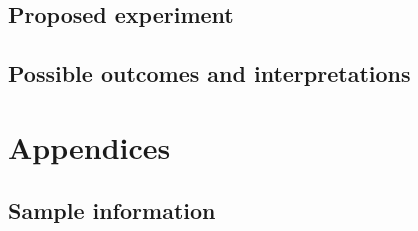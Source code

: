 \documentclass[12pt]{article}
\begin{document}
		\subsection{Proposed experiment}
		
		\subsection{Possible outcomes and interpretations}				
	

\appendix
	\section{Appendices}
		
		\subsection{Sample information}

			
			
			
			
\end{document}
